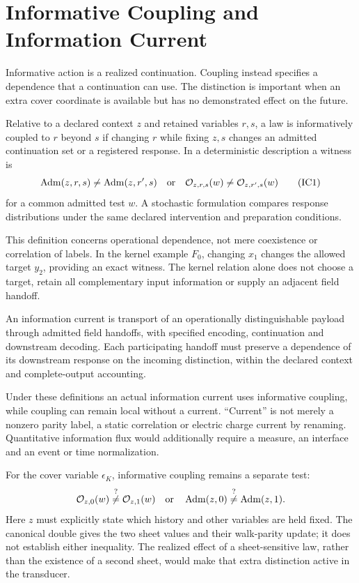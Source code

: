 \begingroup
\renewcommand{\thesection}{6A}
\section{Informative Coupling and Information Current}\label{sec:coupling}
Informative action is a realized continuation. Coupling instead specifies a dependence that a continuation can use. The distinction is important when an extra cover coordinate is available but has no demonstrated effect on the future.

\begin{definition}
Relative to a declared context $z$ and retained variables $r,s$, a law is informatively coupled to $r$ beyond $s$ if changing $r$ while fixing $z,s$ changes an admitted continuation set or a registered response. In a deterministic description a witness is
\begin{equation}
\operatorname{Adm}(z,r,s)\ne\operatorname{Adm}(z,r',s)
\quad\text{or}\quad
\mathcal O_{z,r,s}(w)\ne\mathcal O_{z,r',s}(w)
\tag{IC1}\label{eq:informativecoupling}
\end{equation}
for a common admitted test $w$. A stochastic formulation compares response distributions under the same declared intervention and preparation conditions.
\end{definition}
This definition concerns operational dependence, not mere coexistence or correlation of labels. In the kernel example $F_0$, changing $x_1$ changes the allowed target $y_2$, providing an exact witness. The kernel relation alone does not choose a target, retain all complementary input information or supply an adjacent field handoff.

\begin{definition}
An information current is transport of an operationally distinguishable payload through admitted field handoffs, with specified encoding, continuation and downstream decoding. Each participating handoff must preserve a dependence of its downstream response on the incoming distinction, within the declared context and complete-output accounting.
\end{definition}
Under these definitions an actual information current uses informative coupling, while coupling can remain local without a current. ``Current'' is not merely a nonzero parity label, a static correlation or electric charge current by renaming. Quantitative information flux would additionally require a measure, an interface and an event or time normalization.

For the cover variable $\epsilon_K$, informative coupling remains a separate test:
\[
\mathcal O_{z,0}(w)\stackrel{?}{\ne}\mathcal O_{z,1}(w)
\quad\text{or}\quad
\operatorname{Adm}(z,0)\stackrel{?}{\ne}\operatorname{Adm}(z,1).
\]
Here $z$ must explicitly state which history and other variables are held fixed. The canonical double gives the two sheet values and their walk-parity update; it does not establish either inequality. The realized effect of a sheet-sensitive law, rather than the existence of a second sheet, would make that extra distinction active in the transducer.
\endgroup
\setcounter{section}{6}
